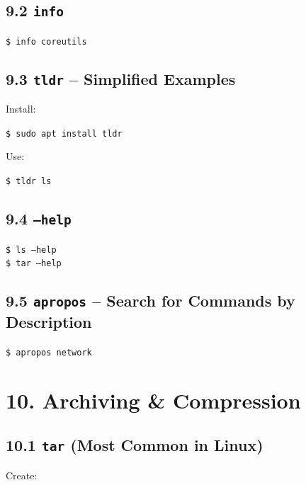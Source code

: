 \documentclass[12pt]{article}
\begin{document}
\subsection*{9.2 \texttt{info}}

\begin{highlightbox}
\texttt{\$ info coreutils}
\end{highlightbox}

\subsection*{9.3 \texttt{tldr} – Simplified Examples}

Install:

\begin{highlightbox}
\texttt{\$ sudo apt install tldr}
\end{highlightbox}

Use:

\begin{highlightbox}
\texttt{\$ tldr ls}
\end{highlightbox}

\subsection*{9.4 \texttt{--help}}

\begin{highlightbox}
\texttt{\$ ls --help}\\
\texttt{\$ tar --help}
\end{highlightbox}

\subsection*{9.5 \texttt{apropos} – Search for Commands by Description}

\begin{highlightbox}
\texttt{\$ apropos network}
\end{highlightbox}

\section*{10. Archiving \& Compression}

\subsection*{10.1 \texttt{tar} (Most Common in Linux)}

Create:
\end{document}
